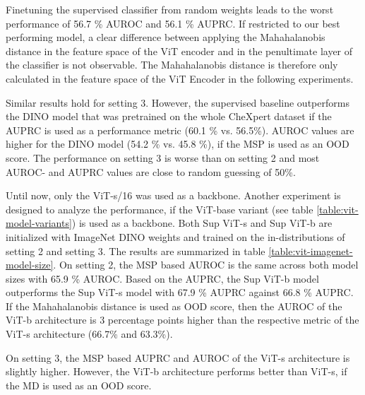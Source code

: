 Finetuning the supervised classifier from random weights leads to the worst performance of 56.7 \% AUROC and 56.1 \% AUPRC.
If restricted to our best performing model, a clear difference between applying the Mahahalanobis distance in the feature space of the ViT encoder and in the penultimate layer of the classifier is not observable.
The Mahahalanobis distance is therefore only calculated in the feature space of the ViT Encoder in the following experiments.
\par
Similar results hold for setting 3. However, the supervised baseline outperforms the DINO model that was pretrained on the whole CheXpert dataset if the AUPRC is used as a performance metric (60.1 \% vs. 56.5\%).
AUROC values are higher for the DINO model (54.2 \% vs. 45.8 \%), if the MSP is used as an OOD score.
The performance on setting 3 is worse than on setting 2 and most AUROC- and AUPRC values are close to random guessing of 50\%.
\par
Until now, only the ViT-s/16 was used as a backbone.
Another experiment is designed to analyze the performance, if the ViT-base variant (see table \ref{table:vit-model-variants}) is used as a backbone.
Both Sup ViT-s and Sup ViT-b are initialized with ImageNet DINO weights and trained on the in-distributions of setting 2 and setting 3.
The results are summarized in table \ref{table:vit-imagenet-model-size}.
On setting 2, the MSP based AUROC is the same across both model sizes with 65.9 \% AUROC.
Based on the AUPRC, the Sup ViT-b model outperforms the Sup ViT-s model with 67.9 \% AUPRC against 66.8 \% AUPRC.
If the Mahahalanobis distance is used as OOD score, then the AUROC of the ViT-b architecture is 3 percentage points higher than the respective metric of the ViT-s architecture (66.7\% and 63.3\%).
\par
On setting 3, the MSP based AUPRC and AUROC of the ViT-s architecture is slightly higher.
However, the ViT-b architecture performs better than ViT-s, if the MD is used as an OOD score.
